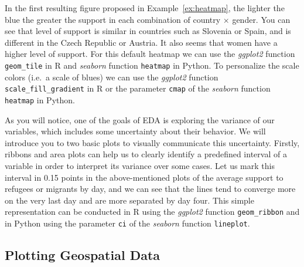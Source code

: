 In the first resulting figure proposed in Example~\ref{ex:heatmap}, the lighter the blue the greater the support in each combination of country $\times$ gender. You can see that level of support is similar in countries such as Slovenia or Spain, and is different in the Czech Republic or Austria. It also seems that women have a higher level of support. For this default heatmap we can use the \emph{ggplot2} function \texttt{geom\_tile} in R and \emph{seaborn} function \texttt{heatmap} in Python.  To personalize the scale colors (i.e.\ a scale of blues) we can use the \emph{ggplot2} function \texttt{scale\_fill\_gradient} in R or the parameter \texttt{cmap} of the \emph{seaborn} function \texttt{heatmap} in Python.


As you will notice, one of the goals of EDA is exploring the variance of our variables, which includes some uncertainty about their behavior. We will introduce you to two basic plots to visually communicate this uncertainty. Firstly, ribbons and area plots can help us to clearly identify a predefined interval of a variable in order to interpret its variance over some cases. Let us mark this interval in 0.15 points in the above-mentioned plots of the average support to refugees or migrants by day, and we can see that the lines tend to converge more on the very last day and are more separated by  day four. This simple representation can be conducted in R using the \emph{ggplot2} function \texttt{geom\_ribbon} and in Python using the parameter \texttt{ci} of the \emph{seaborn} function \texttt{lineplot}.





\subsection{Plotting Geospatial Data}\label{sec:plotgeo}

